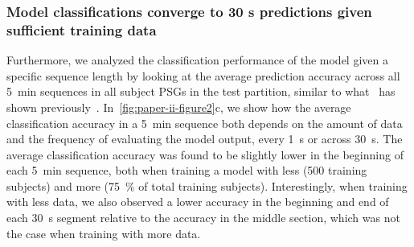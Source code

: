 \subsubsection{Model classifications converge to 30 s predictions given sufficient training data}
Furthermore, we analyzed the classification performance of the model given a specific sequence length by looking at the average prediction accuracy across all \SI{5}{\minute} sequences in all subject PSGs in the test partition, similar to what~\citeauthor{Brink-Kjaer2019} has shown previously~\cite{Brink-Kjaer2019}.
In~\cref{fig:paper-ii-figure2}c, we show how the average classification accuracy in a \SI{5}{\minute} sequence both depends on the amount of data and the frequency of evaluating the model output, \ie every \SI{1}{\second} or across \SI{30}{\second}.
The average classification accuracy was found to be slightly lower in the beginning of each \SI{5}{\minute} sequence, both when training a model with less (500 training subjects) and more (\SI{75}{\percent} of total training subjects).
Interestingly, when training with less data, we also observed a lower accuracy in the beginning and end of each \SI{30}{\second} segment relative to the accuracy in the middle section, which was not the case when training with more data.


